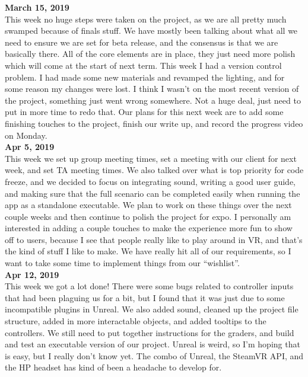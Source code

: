 \textbf{March 15, 2019}\\
This week no huge steps were taken on the project, as we are all pretty much swamped because of finals stuff. We have mostly been talking about what all we need to ensure we are set for beta release, and the consensus is that we are basically there. All of the core elements are in place, they just need more polish which will come at the start of next term.
This week I had a version control problem. I had made some new materials and revamped the lighting, and for some reason my changes were lost. I think I wasn’t on the most recent version of the project, something just went wrong somewhere. Not a huge deal, just need to put in more time to redo that.
Our plans for this next week are to add some finishing touches to the project, finish our write up, and record the progress video on Monday.\\

\textbf{Apr 5, 2019}\\
This week we set up group meeting times, set a meeting with our client for next week, and set TA meeting times. We also talked over what is top priority for code freeze, and we decided to focus on integrating sound, writing a good user guide, and making sure that the full scenario can be completed easily when running the app as a standalone executable.
We plan to work on these things over the next couple weeks and then continue to polish the project for expo. I personally am interested in adding a couple touches to make the experience more fun to show off to users, because I see that people really like to play around in VR, and that’s the kind of stuff I like to make. We have really hit all of our requirements, so I want to take some time to implement things from our “wishlist”.\\

\textbf{Apr 12, 2019}\\
This week we got a lot done! There were some bugs related to controller inputs that had been plaguing us for a bit, but I found that it was just due to some incompatible plugins in Unreal. We also added sound, cleaned up the project file structure, added in more interactable objects, and added tooltips to the controllers.
We still need to put together instructions for the graders, and build and test an executable version of our project. Unreal is weird, so I’m hoping that is easy, but I really don’t know yet. The combo of Unreal, the SteamVR API, and the HP headset has kind of been a headache to develop for.\\

